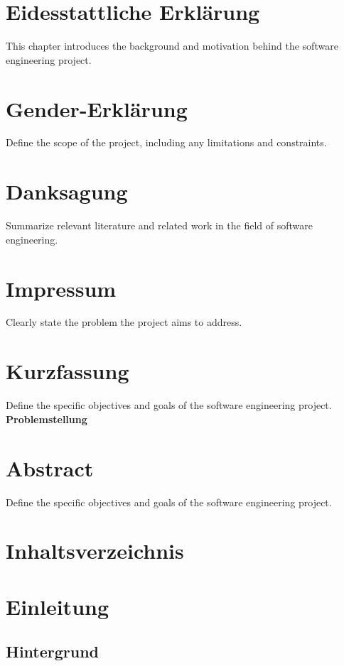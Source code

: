 \documentclass[pdftex,11pt,a4paper]{book}
\begin{document}
\maketitle

\tableofcontents

\chapter{Eidesstattliche Erklärung}
This chapter introduces the background and motivation behind the software engineering project.

\chapter{Gender-Erklärung}
Define the scope of the project, including any limitations and constraints.

\chapter{Danksagung}
Summarize relevant literature and related work in the field of software engineering.

\chapter{Impressum}
Clearly state the problem the project aims to address.

\chapter{Kurzfassung}
Define the specific objectives and goals of the software engineering project.
\textbf{Problemstellung} 

\chapter{Abstract}
Define the specific objectives and goals of the software engineering project.

\chapter{Inhaltsverzeichnis}

\chapter{Einleitung}
\section{Hintergrund}
\end{document}
